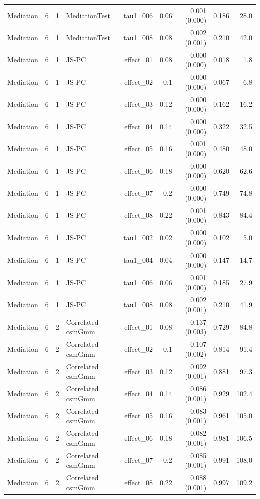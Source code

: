 \begin{longtable}{lcclrrrrr}
Mediation & 6 & 1 & MediationTest & tau1\_006 & 0.06 & 0.001 (0.000) & 0.186 & 28.0\\
Mediation & 6 & 1 & MediationTest & tau1\_008 & 0.08 & 0.002 (0.001) & 0.210 & 42.0\\
Mediation & 6 & 1 & JS-PC & effect\_01 & 0.08 & 0.000 (0.000) & 0.018 & 1.8\\
Mediation & 6 & 1 & JS-PC & effect\_02 & 0.1 & 0.000 (0.000) & 0.067 & 6.8\\
Mediation & 6 & 1 & JS-PC & effect\_03 & 0.12 & 0.000 (0.000) & 0.162 & 16.2\\
Mediation & 6 & 1 & JS-PC & effect\_04 & 0.14 & 0.000 (0.000) & 0.322 & 32.5\\
Mediation & 6 & 1 & JS-PC & effect\_05 & 0.16 & 0.001 (0.000) & 0.480 & 48.0\\
Mediation & 6 & 1 & JS-PC & effect\_06 & 0.18 & 0.000 (0.000) & 0.620 & 62.6\\
Mediation & 6 & 1 & JS-PC & effect\_07 & 0.2 & 0.000 (0.000) & 0.749 & 74.8\\
Mediation & 6 & 1 & JS-PC & effect\_08 & 0.22 & 0.001 (0.000) & 0.843 & 84.4\\
Mediation & 6 & 1 & JS-PC & tau1\_002 & 0.02 & 0.000 (0.000) & 0.102 & 5.0\\
Mediation & 6 & 1 & JS-PC & tau1\_004 & 0.04 & 0.000 (0.000) & 0.147 & 14.7\\
Mediation & 6 & 1 & JS-PC & tau1\_006 & 0.06 & 0.001 (0.000) & 0.185 & 27.9\\
Mediation & 6 & 1 & JS-PC & tau1\_008 & 0.08 & 0.002 (0.001) & 0.210 & 41.9\\
Mediation & 6 & 2 & Correlated csmGmm & effect\_01 & 0.08 & 0.137 (0.003) & 0.729 & 84.8\\
Mediation & 6 & 2 & Correlated csmGmm & effect\_02 & 0.1 & 0.107 (0.002) & 0.814 & 91.4\\
Mediation & 6 & 2 & Correlated csmGmm & effect\_03 & 0.12 & 0.092 (0.001) & 0.881 & 97.3\\
Mediation & 6 & 2 & Correlated csmGmm & effect\_04 & 0.14 & 0.086 (0.001) & 0.929 & 102.4\\
Mediation & 6 & 2 & Correlated csmGmm & effect\_05 & 0.16 & 0.083 (0.001) & 0.961 & 105.0\\
Mediation & 6 & 2 & Correlated csmGmm & effect\_06 & 0.18 & 0.082 (0.001) & 0.981 & 106.5\\
Mediation & 6 & 2 & Correlated csmGmm & effect\_07 & 0.2 & 0.085 (0.001) & 0.991 & 108.0\\
Mediation & 6 & 2 & Correlated csmGmm & effect\_08 & 0.22 & 0.088 (0.001) & 0.997 & 109.2\\

\end{longtable}
